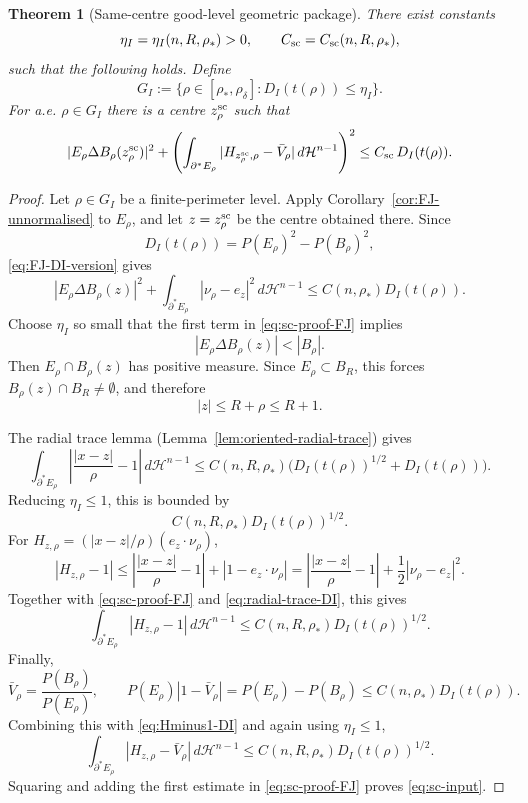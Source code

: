 \documentclass[11pt]{amsart}
\newtheorem{theorem}{Theorem}[section]
\theoremstyle{definition}
\newcommand{\rstar}{\rho_*}
\newcommand{\rdel}{\rho_\delta}
\newcommand{\Hn}{\mathcal H^{n-1}}
\newcommand{\Per}{P}
\begin{document}
\begin{theorem}[Same-centre good-level geometric package]\label{inp:samecenter}
There exist constants
\[
   \eta_I=\eta_I(n,R,\rstar)>0,\qquad
   C_{\rm sc}=C_{\rm sc}(n,R,\rstar),
\]
such that the following holds.  Define
\[
   G_I:=\{\rho\in[\rstar,\rdel]:D_I(t(\rho))\le\eta_I\}.
\]
For a.e. \(\rho\in G_I\) there is a centre \(z_\rho^{\rm sc}\) such that
\begin{equation}\label{eq:sc-input}
   |E_\rho\Delta B_\rho(z_\rho^{\rm sc})|^2
   +
   \left(
      \int_{\partial^*E_\rho}
         |H_{z_\rho^{\rm sc},\rho}-\bar V_\rho|\,d\Hn
   \right)^2
   \le C_{\rm sc}\,D_I(t(\rho)).
\end{equation}
\end{theorem}

\begin{proof}
Let \(\rho\in G_I\) be a finite-perimeter level.  Apply
Corollary~\ref{cor:FJ-unnormalised} to \(E_\rho\), and let
\(z=z_\rho^{\rm sc}\) be the centre obtained there.  Since
\[
   D_I(t(\rho))=\Per(E_\rho)^2-\Per(B_\rho)^2,
\]
\eqref{eq:FJ-DI-version} gives
\begin{equation}\label{eq:sc-proof-FJ}
   |E_\rho\Delta B_\rho(z)|^2
   +
   \int_{\partial^*E_\rho}|\nu_\rho-e_z|^2\,d\Hn
   \le C(n,\rstar)D_I(t(\rho)).
\end{equation}
Choose \(\eta_I\) so small that the first term in
\eqref{eq:sc-proof-FJ} implies
\[
   |E_\rho\Delta B_\rho(z)|<|B_\rho|.
\]
Then \(E_\rho\cap B_\rho(z)\) has positive measure.  Since
\(E_\rho\subset B_R\), this forces \(B_\rho(z)\cap B_R\ne\emptyset\), and
therefore
\begin{equation}\label{eq:sc-centre-localised}
   |z|\le R+\rho\le R+1 .
\end{equation}

The radial trace lemma (Lemma~\ref{lem:oriented-radial-trace}) gives
\[
   \int_{\partial^*E_\rho}
      \left|\frac{|x-z|}{\rho}-1\right|\,d\Hn
   \le
   C(n,R,\rstar)
   \bigl(D_I(t(\rho))^{1/2}+D_I(t(\rho))\bigr).
\]
Reducing \(\eta_I\le1\), this is bounded by
\begin{equation}\label{eq:radial-trace-DI}
   C(n,R,\rstar)D_I(t(\rho))^{1/2}.
\end{equation}
For \(H_{z,\rho}=(|x-z|/\rho)(e_z\cdot\nu_\rho)\),
\[
   |H_{z,\rho}-1|
   \le
   \left|\frac{|x-z|}{\rho}-1\right|
   +
   |1-e_z\cdot\nu_\rho|
   =
   \left|\frac{|x-z|}{\rho}-1\right|
   +
   \frac12|\nu_\rho-e_z|^2 .
\]
Together with \eqref{eq:sc-proof-FJ} and \eqref{eq:radial-trace-DI},
this gives
\begin{equation}\label{eq:Hminus1-DI}
   \int_{\partial^*E_\rho}|H_{z,\rho}-1|\,d\Hn
   \le C(n,R,\rstar)D_I(t(\rho))^{1/2}.
\end{equation}
Finally,
\[
   \bar V_\rho=\frac{\Per(B_\rho)}{\Per(E_\rho)},\qquad
   \Per(E_\rho)|1-\bar V_\rho|
   =
   \Per(E_\rho)-\Per(B_\rho)
   \le C(n,\rstar)D_I(t(\rho)).
\]
Combining this with \eqref{eq:Hminus1-DI} and again using
\(\eta_I\le1\),
\[
   \int_{\partial^*E_\rho}|H_{z,\rho}-\bar V_\rho|\,d\Hn
   \le C(n,R,\rstar)D_I(t(\rho))^{1/2}.
\]
Squaring and adding the first estimate in \eqref{eq:sc-proof-FJ} proves
\eqref{eq:sc-input}.
\end{proof}
\end{document}
